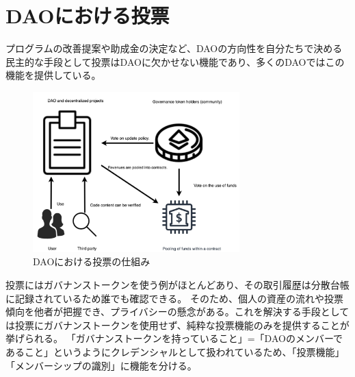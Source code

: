 \documentclass[twocolumn,a4j]{jarticle}
\begin{document}
\section{DAOにおける投票}
プログラムの改善提案や助成金の決定など、DAOの方向性を自分たちで決める民主的な手段として投票はDAOに欠かせない機能であり、多くのDAOではこの機能を提供している。
\begin{figure}[htbp]
  \begin{center}
    \includegraphics[width=80mm]{vote.png}
    \caption{DAOにおける投票の仕組み}
  \end{center}
\end{figure}
投票にはガバナンストークンを使う例がほとんどあり、その取引履歴は分散台帳に記録されているため誰でも確認できる。
そのため、個人の資産の流れや投票傾向を他者が把握でき、プライバシーの懸念がある。これを解決する手段としては投票にガバナンストークンを使用せず、純粋な投票機能のみを提供することが挙げられる。
「ガバナンストークンを持っていること」=「DAOのメンバーであること」というようにクレデンシャルとして扱われているため、「投票機能」「メンバーシップの識別」に機能を分ける。
\end{document}
